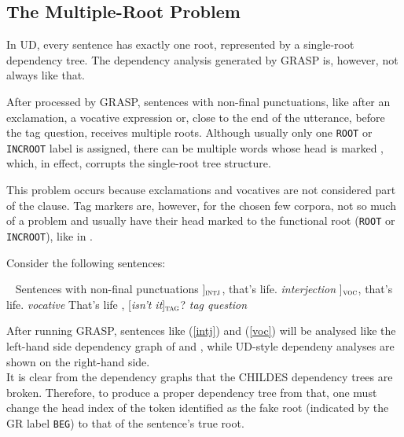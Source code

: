 \subsection{The Multiple-Root Problem}
In UD, every sentence has exactly one root, represented by a single-root dependency tree. The dependency analysis generated by GRASP is, however, not always like that.

After processed by GRASP, sentences with non-final punctuations, like after an exclamation, a vocative expression or, close to the end of the utterance, before the tag question, receives multiple roots. Although usually only one \texttt{ROOT} or \texttt{INCROOT} label is assigned, there can be multiple words whose head is marked , which, in effect, corrupts the single-root tree structure.

This problem occurs because exclamations and vocatives are not considered part of the clause. Tag markers are, however, for the chosen few corpora, not so much of a problem and usually have their head marked to the functional root (\texttt{ROOT} or \texttt{INCROOT}), like in .

Consider the following sentences:

\pex~ Sentences with non-final punctuations\label{roots}
\a {[\sl Well\/}]$_{\text{\sc intj}}$, that's life.        \hfill {\sl interjection}\label{intj}
\a {[\sl  Son\/}]$_{\text{\sc voc}}$, that's life.         \hfill {\sl vocative}\label{voc}
\a That's life , {[\sl isn't it}]$_{\text{\sc tag}}$?    \hfill {\sl tag question}\label{tagq}
\xe


After running GRASP, sentences like (\ref{intj}) and (\ref{voc}) will be analysed like the left-hand side dependency graph of  and , while UD-style dependeny analyses are shown on the right-hand side.\\


It is clear from the dependency graphs that the CHILDES dependency trees are broken. Therefore, to produce a proper dependency tree from that, one must change the head index of the token identified as the fake root (indicated by the GR label \texttt{BEG}) to that of the sentence's true root.

